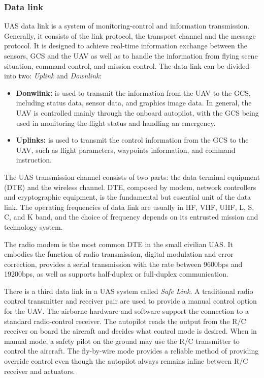 \subsubsection{Data link}
UAS data link is a system of monitoring-control and information transmission. Generally, it consists of the link protocol, the transport channel and the message protocol. It is designed to achieve real-time information exchange between the sensors, GCS and the UAV as well as to handle the information from flying scene situation, command control, and mission control.\cite{6305636} The data link can be divided into two: \textit{Uplink} and \textit{Downlink}:

\begin{itemize}
    \item \textbf{Donwlink:}  is used to transmit the information from the UAV to the GCS, including status data, sensor data, and graphics image data. In general, the UAV is controlled mainly through the onboard autopilot, with the GCS being used in monitoring the flight status and handling an emergency. \cite{6305636}
    \item \textbf{Uplinks:} is used to transmit the control information from the GCS to the UAV, such as flight parameters, waypoints information, and command instruction. \cite{6305636}
\end{itemize}

The UAS transmission channel consists of two parts: the data terminal equipment (DTE) and the wireless channel. DTE, composed by modem, network controllers and cryptographic equipment, is the fundamental but essential unit of the data link. The operating frequencies of data link are usually in HF, VHF, UHF, L, S, C, and K band, and the choice of frequency depends on its entrusted mission and technology system.\cite{6305636}

The radio modem is the most common DTE in the small civilian UAS. It embodies the function of radio transmission, digital modulation and error correction, provides a serial transmission with the rate between 9600bps and 19200bps, as well as supports half-duplex or full-duplex communication.\cite{6305636}

There is a third data link in a UAS system called \textit{Safe Link}. A traditional radio control transmitter and receiver pair are used to provide a manual control option for the UAV. The airborne hardware and software support the connection to a standard radio-control receiver. The autopilot reads the output from the R/C receiver on board the aircraft and decides what control mode is desired. When in manual mode, a safety pilot on the ground may use the R/C transmitter to control the aircraft. The fly-by-wire mode provides a reliable method of providing override control even though the autopilot always remains inline between R/C receiver and actuators.\cite{Hattenberger2014UsingTP}

